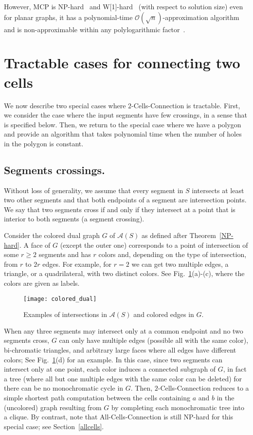 \documentclass[11pt,a4paper]{article}
\begin{document}
However, MCP is NP-hard~\cite{BLWZ05} and W[1]-hard~\cite{FGK10} (with respect to solution size) even for planar graphs, it has a polynomial-time $\mathcal{O}(\sqrt{n})$-approximation algorithm and is non-approximable within any polylogarithmic factor~\cite{HMS07}. 

\section{Tractable cases for connecting two cells}

We now describe two special cases where {\sc $2$-Cells-Connection} is tractable. First, we consider the case where the input segments
have few crossings, in a sense that is specified below. Then, we return to the special case where we have a polygon and provide an algorithm
that takes polynomial time when the number of holes in the polygon is constant.
 
\subsection{Segments crossings.}
Without loss of generality, we assume that every segment in $S$ intersects at least two other segments and that both endpoints of a segment are intersection points. We say that two segments cross if and only if they intersect at a point that is interior to both segments (a segment crossing).

Consider the colored dual graph $G$ of $\mathcal{A}(S)$ as defined after Theorem~\ref{NP-hard}. A face of $G$ (except the outer one) corresponds to a point of intersection of some $r\geq 2$ segments and has $r$ colors and, depending on the type of intersection, from $r$ to $2r$ edges. 
For example, for $r=2$ we can get two multiple edges, a triangle, or a quadrilateral, with two distinct colors. See Fig.~\ref{fig:colored_dual}(a)-(c), where the colors are given as labels.

\begin{figure}[t]
\centering
\texttt{[image: colored\_dual]}
\caption{Examples of intersections in $\mathcal{A}(S)$ and colored edges in $G$.}
\label{fig:colored_dual}
\end{figure}

When any three segments may intersect only at a common endpoint and no two segments cross, $G$ can only have multiple edges (possible all with the same color), bi-chromatic triangles, and arbitrary large faces where all edges have different colors; See Fig.~\ref{fig:colored_dual}(d) for an example. In this case, since two segments can intersect only at one point, each color induces a connected subgraph of $G$, in fact a tree (where all but one multiple edges with the same color can be deleted) for there can be no monochromatic cycle in $G$.  Then, {\sc $2$-Cells-Connection} reduces to a simple shortest path computation between the cells containing $a$ and $b$ in the (uncolored) graph resulting from $G$ by completing each monochromatic tree into a clique.
By contrast, note that {All-Cells-Connection} is still NP-hard for this special case; see Section~\ref{allcells}.
\end{document}
